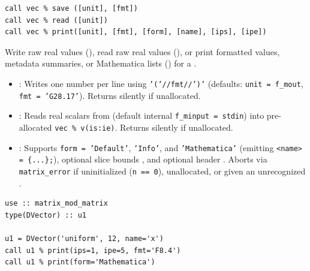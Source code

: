 \lstset{language=[95]Fortran}
\begin{lstlisting}
call vec % save ([unit], [fmt])
call vec % read ([unit])
call vec % print([unit], [fmt], [form], [name], [ips], [ipe])
\end{lstlisting}

Write raw real values (), read raw real values (), or print formatted values, metadata summaries, or Mathematica lists () for a .

\begin{itemize}
  \item {}: Writes one  number per line using \texttt{'('//fmt//')'} (defaults: \texttt{unit = f\_mout}, \texttt{fmt = 'G28.17'}). Returns silently if unallocated.
  \item {}: Reads real scalars from  (default internal \texttt{f\_minput = stdin}) into pre-allocated \texttt{vec \% v(is:ie)}. Returns silently if unallocated.
  \item {}: Supports \texttt{form = 'Default'}, \texttt{'Info'}, and \texttt{'Mathematica'} (emitting \texttt{<name> = \{...\};}), optional slice bounds , and optional header . Aborts via \texttt{matrix\_error} if uninitialized (\texttt{n == 0}), unallocated, or given an unrecognized .
\end{itemize}

\begin{description}[leftmargin=2.2cm, style=nextline]
\end{description}

\lstset{language=[95]Fortran}
\begin{lstlisting}
use :: matrix_mod_matrix
type(DVector) :: u1

u1 = DVector('uniform', 12, name='x')
call u1 % print(ips=1, ipe=5, fmt='F8.4')
call u1 % print(form='Mathematica')
\end{lstlisting}

